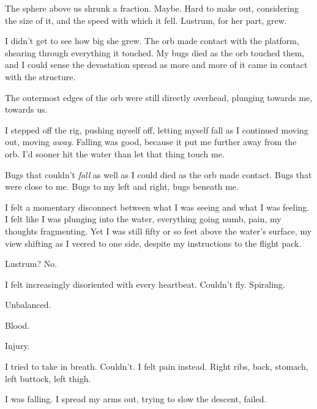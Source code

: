 The sphere above us shrunk a fraction.  Maybe.  Hard to make out, considering the size of it, and the speed with which it fell.  Lustrum, for her part, grew.



I didn't get to see how big she grew.  The orb made contact with the platform, shearing through everything it touched.  My bugs died as the orb touched them, and I could sense the devastation spread as more and more of it came in contact with the structure.



The outermost edges of the orb were still directly overhead, plunging towards me, towards us.



I stepped off the rig, pushing myself off, letting myself fall as I continued moving out, moving \emph{away}.  Falling was good, because it put me further away from the orb.  I'd sooner hit the water than let that thing touch me.



Bugs that couldn't \emph{fall} as well as I could died as the orb made contact.  Bugs that were close to me.  Bugs to my left and right, bugs beneath me.



I felt a momentary disconnect between what I was seeing and what I was feeling.  I felt like I was plunging into the water, everything going numb, pain, my thoughts fragmenting.  Yet I was still fifty or so feet above the water's surface, my view shifting as I veered to one side, despite my instructions to the flight pack.



Lustrum?  No.



I felt increasingly disoriented with every heartbeat.  Couldn't fly.  Spiraling.



Unbalanced.



Blood.



Injury.



I tried to take in breath.  Couldn't.  I felt pain instead.  Right ribs, back, stomach, left buttock, left thigh.



I was falling.  I spread my arms out, trying to slow the descent, failed.



